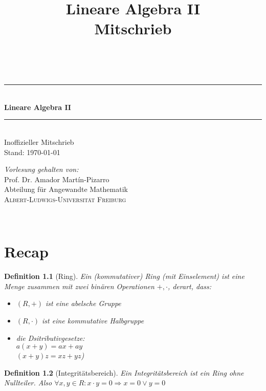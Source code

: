 \documentclass{report}
\title{Lineare Algebra II\\Mitschrieb}
\theoremstyle{customrem}
\theoremstyle{customdef}
\newtheorem{definition}{Definition}[chapter]
\theoremstyle{customenv}
\begin{document}
\begin{titlepage}
  \newcommand{\HRule}{\rule{\linewidth}{0.5mm}}
  \centering
  \vspace{6cm}
  \textsc{\large \thinspace}\\[0.5cm]
  \vspace{4cm}
  \HRule \\[0.8cm]
  { \Huge  \textbf{Lineare Algebra \(\mathbf{II}\)}}\\[0.4cm]
  \HRule \\[.5cm]
  {\Large Inoffizieller Mitschrieb}\\[1.0cm]
  Stand: \today
  \\[11.5cm]
  \begin{minipage}{0.65\textwidth}
    \begin{center} \large
      \textsl{Vorlesung gehalten von:}\\[1cm]
      Prof. Dr. Amador Martín-Pizarro\\
      Abteilung für Angewandte Mathematik\\
      \textsc{\large Albert-Ludwigs-Universität Freiburg}
    \end{center}
  \end{minipage}\\[2.5cm]
  \thispagestyle{empty}
\end{titlepage}


\chapter{Recap}

\begin{definition}[Ring]
  Ein (kommutativer) Ring (mit Einselement) ist eine Menge zusammen mit zwei
  bin\"aren Operationen \(+, \cdot\), derart, dass:\\
  \begin{itemize}
    \item{\((R, +)\) ist eine abelsche Gruppe}
    \item{\((R, \cdot)\) ist eine kommutative Halbgruppe}
    \item{die Dsitributivgesetze:\\
    \(a(x+y) = ax + ay\)\\
    \((x + y) z = xz + yz\))}
  \end{itemize}
\end{definition}

\begin{definition}[Integrit\"atsbereich]
  Ein Integrit\"atsbereich ist ein Ring ohne Nullteiler. Also
  \(\forall x, y \in R : x \cdot y = 0 \Rightarrow x = 0 \lor y = 0\)
\end{definition}
\end{document}

